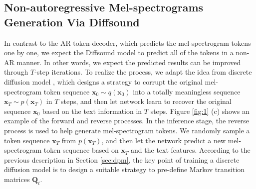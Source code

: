 \documentclass[lettersize,journal]{IEEEtran}
\begin{document}
\subsection{Non-autoregressive Mel-spectrograms Generation Via Diffsound}
In contrast to the AR token-decoder, which predicts the mel-spectrogram tokens one by one, we expect the Diffsound model to predict all of the tokens in a non-AR manner. {\color{black}{Specifically, the Diffsound model can predict all of the tokens simultaneously, then refine the predicted results in the following steps so that the best results can be obtained through iterations.}} In other words, we expect the predicted results can be improved through $T$-step iterations. {\color{black}{In contrast, AR decoder needs $N$ steps to get results, where $N$ denotes the number of tokens (in practice, $N \gg T$).}} {\color{black}{The Diffsound model can make use of the contextual information of all tokens and revise any token in each step. We speculate that it effectively diminishes the unnatural bias and the accumulated prediction error problems.}} To realize the process, we adapt the idea from discrete diffusion model \cite{sohl2015deep,austin2021structured,gu2021vector}, which designs a strategy to corrupt the original mel-spectrogram token sequence $\boldsymbol{x}_0 \sim q(\boldsymbol{x}_0) $ into a totally meaningless sequence $\boldsymbol{x}_T \sim p(\boldsymbol{x}_T)$ in $T$ steps, and then let network learn to recover the original sequence $\boldsymbol{x}_0$ based on the text information in $T$ steps. Figure \ref{fig:1} (c) shows an example of the forward and reverse processes. In the inference stage, the reverse process is used to help generate mel-spectrogram tokens. We randomly sample a token sequence $\boldsymbol{x}_T$ from $p(\boldsymbol{x}_T)$, and then let the network predict a new mel-spectrogram token sequence based on $\boldsymbol{x}_T$ and the text features. According to the previous description in Section \ref{sec:dpm}, the key point of training a discrete diffusion model is to design a suitable strategy to pre-define Markov transition matrices $\boldsymbol{Q}_t$.
\end{document}
